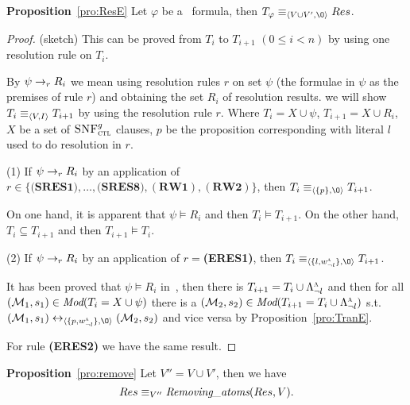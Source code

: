 \documentclass[letterpaper]{article} %
\begin{document}
\noindent\textbf{Proposition}~\ref{pro:ResE}
 Let $\varphi$ be a \CTL\ formula,
 then $T_{\varphi} \equiv_{\tuple{V \cup V', {\O}}} Res$.

\begin{proof}(sketch)
This can be proved from $T_i$ to $T_{i+1}$ $(0\leq i < n)$ by using one resolution rule on $T_i$.


By $\psi \rightarrow_r R_i$ we mean using resolution rules $r$ on set $\psi$ (the formulae in $\psi$ as the premises of rule $r$) and obtaining the set $R_i$ of resolution results.
we will show $T_i \equiv_{{\langle{V,I}\rangle}} T_{i+1}$ by using the resolution rule $r$. Where $T_i= X \cup \psi$, $T_{i+1}=X \cup R_i$, $X$ be a set of ${\textsc{SNF}_{\textsc{ctl}}^g}$ clauses, $p$ be the proposition corresponding with literal $l$ used to do resolution in $r$.

(1) If $\psi \rightarrow_r R_i$ by an application of $r\in \{\textbf{(SRES1)}, \dots, \textbf{(SRES8)}, (\textbf{RW1}), (\textbf{RW2})\}$, then $T_i \equiv_{\tuple{\{p\}, {\O}}} T_{i+1}$.


On one hand, it is apparent that $\psi \models R_i$ and then $T_i \models T_{i+1}$. On the other hand, $T_i\subseteq T_{i+1}$ and then $T_{i+1} \models T_i$.

(2) If $\psi \rightarrow_r R_i$ by an application of $r=$\textbf{(ERES1)},
then $T_i \equiv_{\tuple{\{l, w_{\neg l}^{\ALL}\}, {\O}}} T_{i+1}$.

It has been proved that $\psi \models R_i$ in~\cite{bolotov2000clausal}, then there is $T_{i+1}=T_i \cup \Lambda_{\neg l}^{\textsc{a}}$ and  then for all $({\cal M}_1,s_1) \in \textit{Mod}(T_i= X \cup \psi)$ there is a $({\cal M}_2, s_2)\in \textit{Mod}(T_{i+1}=T_i \cup \Lambda_{\neg l}^{\textsc{a}})$ s.t. $(\Hm_1, s_1) \lrto_{\tuple{\{p, w_{\neg l}^{\ALL}\}, {\O}}} (\Hm_2, s_2)$ and vice versa by Proposition~\ref{pro:TranE}.

For rule \textbf{(ERES2)} we have the same result.

\end{proof}


\noindent\textbf{Proposition}~\ref{pro:remove}
Let $V''=V \cup V'$, then we have
 \[
   Res \equiv_{V''}  \emph{Removing\_atoms}(Res, V).
 \]
\end{document}
